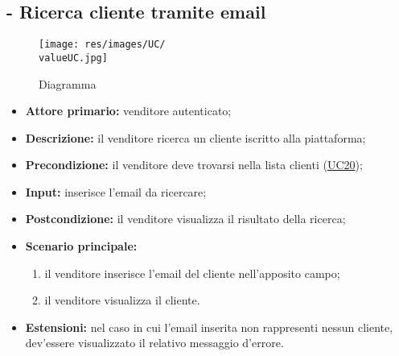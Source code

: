 \subsection{- Ricerca cliente tramite email}
\begin{figure}[H]
    \centering
    \texttt{[image: res/images/UC/\\valueUC.jpg]}
    \caption{Diagramma }
\end{figure}
\begin{itemize}
    \item \textbf{Attore primario:} venditore autenticato;
    \item \textbf{Descrizione:} il venditore ricerca un cliente iscritto alla piattaforma;
    \item \textbf{Precondizione:} il venditore deve trovarsi nella lista clienti (\hyperref[UC20]{UC20});
    \item \textbf{Input:} inserisce l'email da ricercare;
    \item \textbf{Postcondizione:} il venditore visualizza il risultato della ricerca;
    \item \textbf{Scenario principale:}
          \begin{enumerate}
              \item il venditore inserisce l'email del cliente nell'apposito campo;
              \item il venditore visualizza il cliente.
          \end{enumerate}
    \item \textbf{Estensioni:} nel caso in cui l'email inserita non rappresenti nessun cliente, dev'essere visualizzato il relativo messaggio d'errore.
\end{itemize}

\stepUserCase
